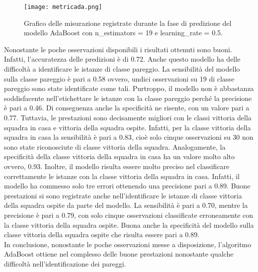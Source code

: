 \begin{figure}[h]
	\begin{center}
		\texttt{[image: metricada.png]}
		\caption{Grafico delle misurazione registrate durante la fase di predizione del modello AdaBoost con \textsf{n\_estimators} = 19 e \textsf{learning\_rate} = 0.5.
		} 
		\label{fig:adametrics}
	\end{center}
\end{figure}
Nonostante le poche osservazioni disponibili i risultati ottenuti sono buoni. Infatti, l'accuratezza delle predizioni è di 0.72. Anche questo modello ha delle difficoltà a identificare le istanze di classe pareggio. La sensibilità del modello sulla classe pareggio è pari a 0.58 ovvero, undici osservazioni su 19 di classe pareggio sono state identificate come tali. Purtroppo, il modello non è abbastanza soddisfacente nell’etichettare le istanze con la classe pareggio perché la precisione è pari a 0.46. Di conseguenza anche la specificità ne risente, con un valore pari a 0.77. Tuttavia, le prestazioni sono decisamente migliori con le classi vittoria della squadra in casa e vittoria della squadra ospite. Infatti, per la classe vittoria della squadra in casa la sensibilità è pari a 0.83, cioè solo cinque osservazioni su 30 non sono state riconosciute di classe vittoria della squadra. Analogamente, la specificità della classe vittoria della squadra in casa ha un valore molto alto ovvero, 0.93. Inoltre, il modello risulta essere molto preciso nel classificare correttamente le istanze con la classe vittoria della squadra in casa. Infatti, il modello ha commesso solo tre errori ottenendo una precisione pari a 0.89. Buone prestazioni si sono registrate anche nell'identificare le istanze di classe vittoria della squadra ospite da parte del modello. La sensibilità è pari a 0.70, mentre la precisione è pari a 0.79, con solo cinque osservazioni classificate erroneamente con la classe vittoria della squadra ospite. Buona anche la specificità del modello sulla classe vittoria della squadra ospite che risulta essere pari a 0.89.\\
In conclusione, nonostante le poche osservazioni messe a disposizione, l'algoritmo AdaBoost ottiene nel complesso delle buone prestazioni nonostante qualche difficoltà nell’identificazione dei pareggi.
